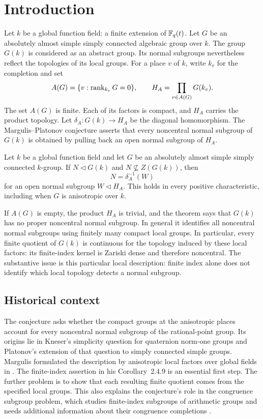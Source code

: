 \section{Introduction}\label{sec:introduction}

Let $k$ be a global function field: a finite extension of $\mathbb F_q(t)$.
Let $G$ be an absolutely almost simple simply connected algebraic group
over $k$. The group $G(k)$ is considered as an abstract group. Its normal
subgroups nevertheless reflect the topologies of its local groups.
For a place $v$ of $k$, write $k_v$ for the completion and set
\[
 A(G)=\{v:\operatorname{rank}_{k_v}G=0\},\qquad
 H_A=\prod_{v\in A(G)}G(k_v).
\]
The set $A(G)$ is finite. Each of its factors is compact, and $H_A$ carries
the product topology. Let $\delta_A:G(k)\longrightarrow H_A$ be the
diagonal homomorphism. The Margulis--Platonov conjecture asserts that
every noncentral normal subgroup of $G(k)$ is obtained by pulling back
an open normal subgroup of $H_A$.

\begin{theorem}\label{thm:main}
Let $k$ be a global function field and let $G$ be an absolutely almost
simple simply connected $k$-group. If
$N\triangleleft G(k)$ and $N\not\subseteq Z(G(k))$, then
\[
                  N=\delta_A^{-1}(W)
\]
for an open normal subgroup $W\triangleleft H_A$. This holds in every
positive characteristic, including when $G$ is anisotropic over $k$.
\end{theorem}

If $A(G)$ is empty, the product $H_A$ is trivial, and the theorem says that
$G(k)$ has no proper noncentral normal subgroup. In general it identifies
all noncentral normal subgroups using finitely many compact local groups.
In particular, every finite quotient of $G(k)$ is continuous for the
topology induced by these local factors: its finite-index kernel is
Zariski dense and therefore noncentral. The substantive issue is this particular
local description: finite index alone does not identify which local
topology detects a normal subgroup.

\subsection{Historical context}

The conjecture asks whether the compact groups at the anisotropic places
account for every noncentral normal subgroup of the rational-point group.
Its origins lie in Kneser's simplicity question for quaternion norm-one
groups and Platonov's extension of that question to simply connected simple
groups. Margulis formulated the description by anisotropic local factors
over global fields in \cite[Russian original, Section~2.4.8]{Margulis1979}.
The finite-index assertion in his Corollary~2.4.9 is an essential first
step. The further problem is to show that each resulting finite quotient
comes from the specified local groups. This also explains the conjecture's
role in the congruence subgroup problem, which studies finite-index
subgroups of arithmetic groups and needs additional information about
their congruence completions
\cite[pp.~73--76]{RapinchukCSP1992}.

